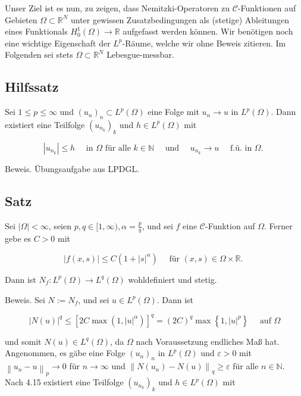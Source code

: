 \documentclass[10pt, letterpaper]{article}
\begin{document}
Unser Ziel ist es nun, zu zeigen, dass Nemitzki-Operatoren zu $\mathcal{C}$-Funktionen auf Gebieten $\Omega \subset \mathbb{R}^{N}$ unter gewissen Zusatzbedingungen als (stetige) Ableitungen eines Funktionals $H_{0}^{1}(\Omega) \rightarrow \mathbb{R}$ aufgefasst werden können. Wir benötigen noch eine wichtige Eigenschaft der $L^{p}$-Räume, welche wir ohne Beweis zitieren. Im Folgenden sei stets $\Omega \subset \mathbb{R}^{N}$ Lebesgue-messbar.

\subsection*{Hilfssatz}

Sei $1 \leq p \leq \infty$ und $\left(u_{n}\right)_{n} \subset L^{p}(\Omega)$ eine Folge mit $u_{n} \rightarrow u$ in $L^{p}(\Omega)$. Dann existiert eine Teilfolge $\left(u_{n_{k}}\right)_{k}$ und $h \in L^{p}(\Omega)$ mit

$$
\left|u_{n_{k}}\right| \leq h \quad \text { in } \Omega \text { für alle } k \in \mathbb{N} \quad \text { und } \quad u_{n_{k}} \rightarrow u \quad \text { f.ü. in } \Omega \text {. }
$$

Beweis. Übungsaufgabe aus LPDGL.

\subsection*{Satz}

Sei $|\Omega|<\infty$, seien $p, q \in[1, \infty), \alpha=\frac{p}{q}$, und sei $f$ eine $\mathcal{C}$-Funktion auf $\Omega$. Ferner gebe es $C>0$ mit

$$
|f(x, s)| \leq C\left(1+|s|^{\alpha}\right) \quad \text { für }(x, s) \in \Omega \times \mathbb{R} \text {. }
$$

Dann ist $N_{f}: L^{p}(\Omega) \rightarrow L^{q}(\Omega)$ wohldefiniert und stetig.

Beweis. Sei $N:=N_{f}$, und sei $u \in L^{p}(\Omega)$. Dann ist

$$
|N(u)|^{q} \leq\left[2 C \max \left(1,|u|^{\alpha}\right)\right]^{q}=(2 C)^{q} \max \left\{1,|u|^{p}\right\} \quad \text { auf } \Omega
$$

und somit $N(u) \in L^{q}(\Omega)$, da $\Omega$ nach Voraussetzung endliches Maß hat. Angenommen, es gäbe eine Folge $\left(u_{n}\right)_{n}$ in $L^{p}(\Omega)$ und $\varepsilon>0$ mit $\left\|u_{n}-u\right\|_{p} \rightarrow 0$ für $n \rightarrow \infty$ und $\left\|N\left(u_{n}\right)-N(u)\right\|_{q} \geq \varepsilon$ für alle $n \in \mathbb{N}$. Nach 4.15 existiert eine Teilfolge $\left(u_{n_{k}}\right)_{k}$ und $h \in L^{p}(\Omega)$ mit
\end{document}

